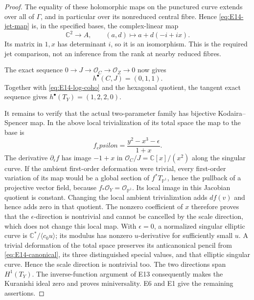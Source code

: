 \begin{proof}
The equality of these holomorphic maps on the punctured curve
extends over all of $\Gamma$, and in particular over its
nonreduced central fibre. Hence \eqref{eq:E14-jet-map} is,
in the specified bases, the complex-linear map
\[
 \mathbb C^2\longrightarrow A,\qquad
 (a,d)\longmapsto a+d(-i+ix).
\]
Its matrix in $1,x$ has determinant $i$, so it is an isomorphism.
This is the required jet comparison, not an inference from the
rank at nearby reduced fibres.

The exact sequence $0\to J\to\mathcal O_C\to\mathcal O_Z\to0$
now gives
\[
 h^\bullet(C,J)=(0,1,1).
\]
Together with \eqref{eq:E14-log-coho} and the hexagonal quotient,
the tangent exact sequence gives
$h^\bullet(T_Y)=(1,2,2,0)$.

It remains to verify that the actual two-parameter family has
bijective Kodaira--Spencer map. In the above local trivialization
of its total space the map to the base is
\[
 f_epsilon=\frac{y^2-x^3-\epsilon}{1+x}.
\]
The derivative $\partial_\epsilon f$ has image $-1+x$ in
$\mathcal O_C/J=\mathbb C[x]/(x^2)$ along the singular curve.
If the ambient first-order deformation were trivial, every
first-order variation of its map would be a global section of
$f^*T_{\mathbb P^1}$, hence the pullback of a projective vector
field, because $f_*\mathcal O_Y=\mathcal O_{\mathbb P^1}$.
Its local image in this Jacobian quotient is constant. Changing
the local ambient trivialization adds $df(v)$ and hence adds
zero in that quotient. The nonzero coefficient of $x$ therefore
proves that the $\epsilon$-direction is nontrivial and cannot be
cancelled by the scale direction, which does not change this local
map. With $\epsilon=0$, a normalized singular elliptic curve is
$\mathbb C^*/\langle c_0u\rangle$; its modulus has nonzero
$u$-derivative for sufficiently small $u$. A trivial deformation
of the total space preserves its anticanonical pencil from
\eqref{eq:E14-canonical}, its three distinguished special values,
and that elliptic singular curve. Hence the scale direction is
nontrivial too. The two directions span $H^1(T_Y)$.
The inverse-function argument of E13 consequently makes the
Kuranishi ideal zero and proves miniversality. E6 and E1 give the
remaining assertions.
\end{proof}



